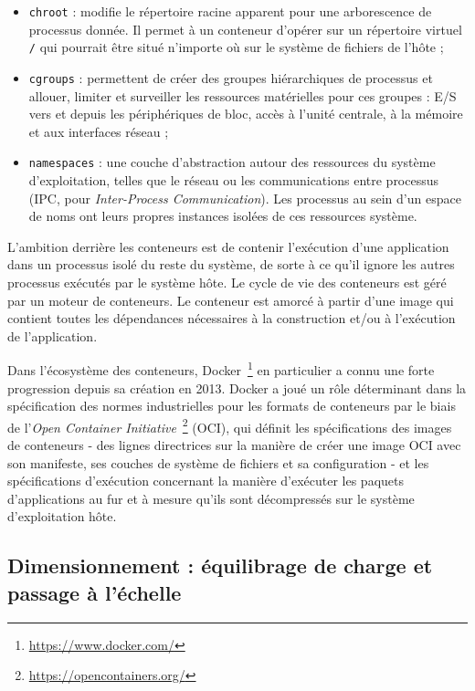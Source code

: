 \begin{itemize}
    \item \texttt{chroot} : modifie le répertoire racine apparent pour une arborescence de processus donnée. Il permet à un conteneur d'opérer sur un répertoire virtuel \texttt{/} qui pourrait être situé n'importe où sur le système de fichiers de l'hôte ;
    \item \texttt{cgroups} : permettent de créer des groupes hiérarchiques de processus et allouer, limiter et surveiller les ressources matérielles pour ces groupes : E/S vers et depuis les périphériques de bloc, accès à l'unité centrale, à la mémoire et aux interfaces réseau ;
    \item \texttt{namespaces} : une couche d'abstraction autour des ressources du système d'exploitation, telles que le réseau ou les communications entre processus (\gls{IPC}, pour \textit{Inter-Process Communication}). Les processus au sein d'un espace de noms ont leurs propres instances isolées de ces ressources système.
\end{itemize}

L'ambition derrière les conteneurs est de contenir l'exécution d'une application dans un processus isolé du reste du système, de sorte à ce qu'il ignore les autres processus exécutés par le système hôte. Le cycle de vie des conteneurs est géré par un moteur de conteneurs. Le conteneur est amorcé à partir d'une image qui contient toutes les dépendances nécessaires à la construction et/ou à l'exécution de l'application.

Dans l'écosystème des conteneurs, Docker~\footnote{\href{https://www.docker.com/}{https://www.docker.com/}} en particulier a connu une forte progression depuis sa création en 2013. Docker a joué un rôle déterminant dans la spécification des normes industrielles pour les formats de conteneurs par le biais de l'\textit{Open Container Initiative}~\footnote{\href{https://opencontainers.org/}{https://opencontainers.org/}} (OCI), qui définit les spécifications des images de conteneurs - des lignes directrices sur la manière de créer une image OCI avec son manifeste, ses couches de système de fichiers et sa configuration - et les spécifications d'exécution concernant la manière d'exécuter les paquets d'applications au fur et à mesure qu'ils sont décompressés sur le système d'exploitation hôte.

\subsection{Dimensionnement : équilibrage de charge et passage à l'échelle}

